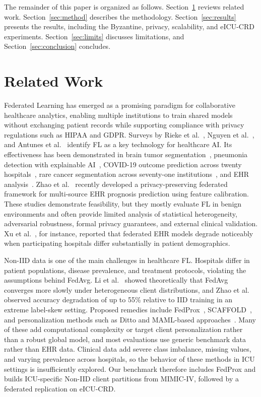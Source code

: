 \documentclass[journal]{IEEEtran}
\begin{document}
The remainder of this paper is organized as follows. Section~\ref{sec:related} reviews related work. Section~\ref{sec:method} describes the methodology. Section~\ref{sec:results} presents the results, including the Byzantine, privacy, scalability, and eICU-CRD experiments. Section~\ref{sec:limits} discusses limitations, and Section~\ref{sec:conclusion} concludes.

\section{Related Work}
\label{sec:related}

Federated Learning has emerged as a promising paradigm for collaborative healthcare analytics, enabling multiple institutions to train shared models without exchanging patient records while supporting compliance with privacy regulations such as HIPAA and GDPR. Surveys by Rieke et al.~\cite{rieke2020future}, Nguyen et al.~\cite{nguyen2022federated}, and Antunes et al.~\cite{antunes2022federated} identify FL as a key technology for healthcare AI. Its effectiveness has been demonstrated in brain tumor segmentation~\cite{sheller2020brain}, pneumonia detection with explainable AI~\cite{biswas2025flpnexainet}, COVID-19 outcome prediction across twenty hospitals~\cite{dayan2021federated}, rare cancer segmentation across seventy-one institutions~\cite{pati2022federated}, and EHR analysis~\cite{kaissis2020secure,xu2021federated}. Zhao et al.~\cite{zhao2025privacy} recently developed a privacy-preserving federated framework for multi-source EHR prognosis prediction using feature calibration. These studies demonstrate feasibility, but they mostly evaluate FL in benign environments and often provide limited analysis of statistical heterogeneity, adversarial robustness, formal privacy guarantees, and external clinical validation. Xu et al.~\cite{xu2021federated}, for instance, reported that federated EHR models degrade noticeably when participating hospitals differ substantially in patient demographics.

Non-IID data is one of the main challenges in healthcare FL. Hospitals differ in patient populations, disease prevalence, and treatment protocols, violating the assumptions behind FedAvg. Li et al.~\cite{li2020convergence} showed theoretically that FedAvg converges more slowly under heterogeneous client distributions, and Zhao et al.~\cite{zhao2018federated} observed accuracy degradation of up to 55\% relative to IID training in an extreme label-skew setting. Proposed remedies include FedProx~\cite{fedprox}, SCAFFOLD~\cite{scaffold}, and personalization methods such as Ditto and MAML-based approaches~\cite{li2021ditto,fallah2020personalized}. Many of these add computational complexity or target client personalization rather than a robust global model, and most evaluations use generic benchmark data rather than EHR data. Clinical data add severe class imbalance, missing values, and varying prevalence across hospitals, so the behavior of these methods in ICU settings is insufficiently explored. Our benchmark therefore includes FedProx and builds ICU-specific Non-IID client partitions from MIMIC-IV, followed by a federated replication on eICU-CRD.
\end{document}
